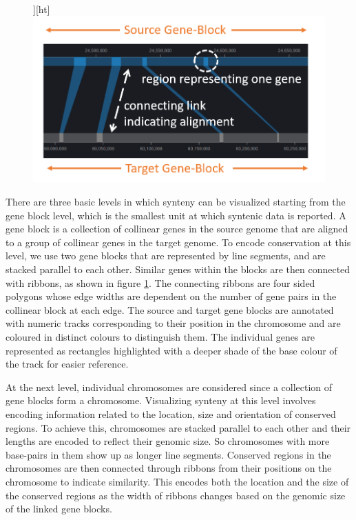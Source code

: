 \begin{figure}][ht]
  \centering
  \includegraphics[width=.50\linewidth]{images/ch_4_link_plot.PNG}
  \label{fig:ch_4_link_plot}
\end{figure}


There are three basic levels in which synteny can be visualized starting from the gene block level, which is the smallest unit at which syntenic data is reported. A gene block is a collection of collinear genes in the source genome that are aligned to a group of collinear genes in the target genome. To encode conservation at this level, we use two gene blocks that are represented by line segments, and are stacked parallel to each other. Similar genes within the blocks are then connected with ribbons, as shown in figure \ref{fig:ch_4_link_plot}. The connecting ribbons are four sided polygons whose edge widths are dependent on the number of gene pairs in the collinear block at each edge. The source and target gene blocks are annotated with numeric tracks corresponding to their position in the chromosome and are coloured in distinct colours to distinguish them. The individual genes are represented as rectangles highlighted with a deeper shade of the base colour of the track for easier reference. 

At the next level, individual chromosomes are considered since a collection of gene blocks form a chromosome. Visualizing synteny at this level involves encoding information related to the location, size and orientation of conserved regions. To achieve this, chromosomes are stacked parallel to each other and their lengths are encoded to reflect their genomic size. So chromosomes with more base-pairs in them show up as longer line segments. Conserved regions in the chromosomes are then connected through ribbons from their positions on the chromosome to indicate similarity. This encodes both the location and the size of the conserved regions as the width of ribbons changes based on the genomic size of the linked gene blocks.


